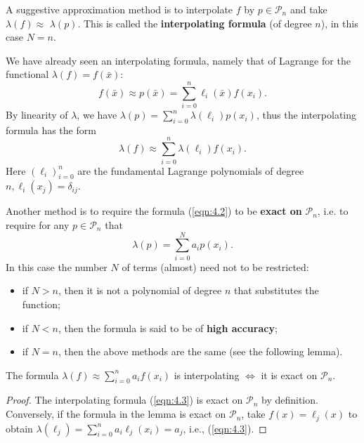 \documentclass[a4paper]{article}
\begin{document}
\begin{method}
    A suggestive approximation method is to interpolate $f$ by $p \in \mathcal{P}_n$ and take $\lambda(f) \approx$ $\lambda(p)$. This is called the \textbf{interpolating formula} (of degree $n$), in this case $N=n$.
\end{method}
We have already seen an interpolating formula, namely that of Lagrange for the functional $\lambda(f)=f(\bar{x})$:
\[
f(\bar{x}) \approx p(\bar{x})=\sum_{i=0}^n \ell_i(\bar{x}) f(x_i) .
\]
By linearity of $\lambda$, we have $\lambda(p)=\sum_{i=0}^n \lambda(\ell_i) p(x_i)$, thus the interpolating formula has the form
\begin{equation}\label{eqn:4.3}
    \lambda(f) \approx \sum_{i=0}^n \lambda(\ell_i) f(x_i) .
\end{equation}
Here $(\ell_i)_{i=0}^n$ are the fundamental Lagrange polynomials of degree $n, \ell_i(x_j)=\delta_{i j}$.
\begin{method}
    Another method is to require the formula (\ref{eqn:4.2}) to be \textbf{exact on} $\mathcal{P}_n$, i.e. to require for any $p \in \mathcal{P}_n$ that
    \[
    \lambda(p)=\sum_{i=0}^N a_i p\left(x_i\right) .
    \]
    In this case the number $N$ of terms (almost) need not to be restricted:
    \begin{itemize}
        \item if $N>n$, then it is not a polynomial of degree $n$ that substitutes the function;
        \item if $N<n$, then the formula is said to be of \textbf{high accuracy};
        \item if $N=n$, then the above methods are the same (see the following lemma).
    \end{itemize}
\end{method}
\begin{lemma}\label{lma:4.3}
    The formula $\lambda(f) \approx \sum_{i=0}^n a_i f(x_i)$ is interpolating $\Longleftrightarrow$ it is exact on $\mathcal{P}_n$.
\end{lemma}
\begin{proof}
    The interpolating formula (\ref{eqn:4.3}) is exact on $\mathcal{P}_n$ by definition. Conversely, if the formula in the lemma is exact on $\mathcal{P}_n$, take $f(x)=\ell_j(x)$ to obtain $\lambda(\ell_j)=\sum_{i=0}^n a_i \ell_j(x_i)=a_j$, i.e., (\ref{eqn:4.3}).
\end{proof}
\end{document}
